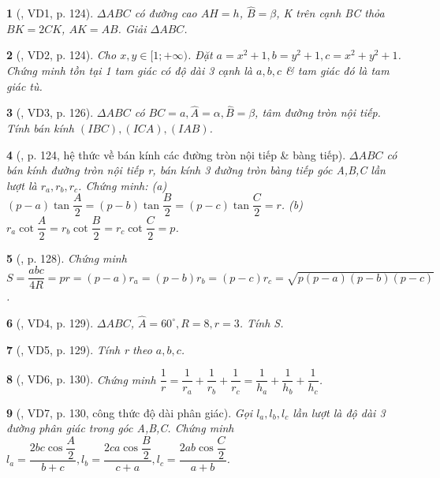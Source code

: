 \documentclass{article}
\newtheorem{baitoan}{}
\begin{document}
\begin{baitoan}[\cite{TLCT_hinh_hoc_10}, VD1, p. 124]
	$\Delta ABC$ có đường cao $AH = h$, $\widehat{B} = \beta$, K trên cạnh BC thỏa $BK = 2CK$, $AK = AB$. Giải $\Delta ABC$.
\end{baitoan}

\begin{baitoan}[\cite{TLCT_hinh_hoc_10}, VD2, p. 124]
	Cho $x,y\in[1;+\infty)$. Đặt $a = x^2 + 1,b = y^2 + 1,c = x^2 + y^2 + 1$. Chứng minh tồn tại 1 tam giác có độ dài 3 cạnh là $a,b,c$ \& tam giác đó là tam giác tù.
\end{baitoan}

\begin{baitoan}[\cite{TLCT_hinh_hoc_10}, VD3, p. 126]
	$\Delta ABC$ có $BC = a,\widehat{A} = \alpha,\widehat{B} = \beta$, tâm đường tròn nội tiếp. Tính bán kính $(IBC),(ICA),(IAB)$.
\end{baitoan}

\begin{baitoan}[\cite{TLCT_hinh_hoc_10}, p. 124, hệ thức về bán kính các đường tròn nội tiếp \& bàng tiếp]
	$\Delta ABC$ có bán kính đường tròn nội tiếp r, bán kính 3 đường tròn bàng tiếp góc A,B,C lần lượt là $r_a,r_b,r_c$. Chứng minh: (a) $(p - a)\tan\dfrac{A}{2} = (p - b)\tan\dfrac{B}{2} = (p - c)\tan\dfrac{C}{2} = r$. (b) $r_a\cot\dfrac{A}{2} = r_b\cot\dfrac{B}{2} = r_c\cot\dfrac{C}{2} = p$.
\end{baitoan}

\begin{baitoan}[\cite{TLCT_hinh_hoc_10}, p. 128]
	Chứng minh $S = \dfrac{abc}{4R} = pr = (p - a)r_a = (p - b)r_b = (p - c)r_c = \sqrt{p(p - a)(p - b)(p - c)}$.
\end{baitoan}

\begin{baitoan}[\cite{TLCT_hinh_hoc_10}, VD4, p. 129]
	$\Delta ABC$, $\widehat{A} = 60^\circ,R = 8,r = 3$. Tính S.
\end{baitoan}

\begin{baitoan}[\cite{TLCT_hinh_hoc_10}, VD5, p. 129]
	Tính r theo $a,b,c$.
\end{baitoan}

\begin{baitoan}[\cite{TLCT_hinh_hoc_10}, VD6, p. 130]
	Chứng minh $\dfrac{1}{r} = \dfrac{1}{r_a} + \dfrac{1}{r_b} + \dfrac{1}{r_c} = \dfrac{1}{h_a} + \dfrac{1}{h_b} + \dfrac{1}{h_c}$.
\end{baitoan}

\begin{baitoan}[\cite{TLCT_hinh_hoc_10}, VD7, p. 130, công thức độ dài phân giác]
	Gọi $l_a,l_b,l_c$ lần lượt là độ dài 3 đường phân giác trong góc A,B,C. Chứng minh $l_a = \dfrac{2bc\cos\dfrac{A}{2}}{b + c},l_b = \dfrac{2ca\cos\dfrac{B}{2}}{c + a},l_c = \dfrac{2ab\cos\dfrac{C}{2}}{a + b}$.
\end{baitoan}
\end{document}
